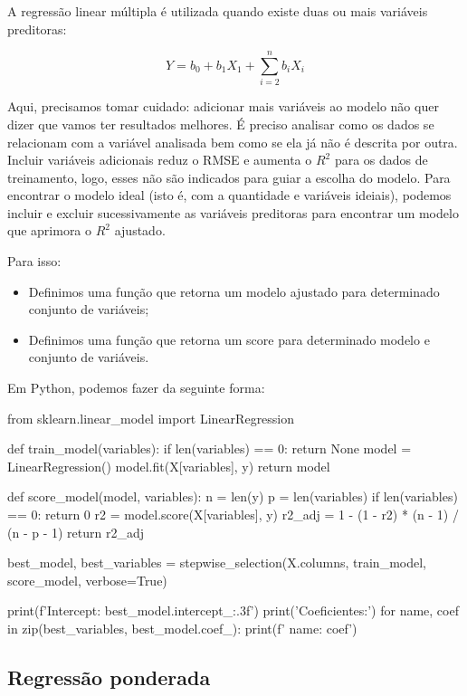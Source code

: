 \documentclass{article}
\begin{document}
A regressão linear múltipla é utilizada quando existe duas ou mais variáveis preditoras:

\begin{equation}
    Y = b_0 + b_1X_1 + \sum_{i = 2}^{n}b_iX_i
\end{equation}

Aqui, precisamos tomar cuidado: adicionar mais variáveis ao modelo não quer dizer que vamos ter resultados melhores.
É preciso analisar como os dados se relacionam com a variável analisada bem como se ela já não é descrita por outra.
Incluir variáveis adicionais reduz o RMSE e aumenta o $R^2$ para os dados de treinamento, logo, esses não são 
indicados para guiar a escolha do modelo. Para encontrar o modelo ideal (isto é, com a quantidade e variáveis ideiais),
podemos incluir e excluir sucessivamente as variáveis preditoras para encontrar um modelo que aprimora o $R^2$ ajustado.

Para isso:

\begin{itemize}
    \item Definimos uma função que retorna um modelo ajustado para determinado conjunto de variáveis;
    \item Definimos uma função que retorna um score para determinado modelo e conjunto de variáveis.
\end{itemize}

Em Python, podemos fazer da seguinte forma:

\begin{pythoncode}
from sklearn.linear_model import LinearRegression

def train_model(variables):
    if len(variables) == 0:
        return None 
    model = LinearRegression()
    model.fit(X[variables], y)
    return model 

def score_model(model, variables):
    n = len(y)
    p = len(variables)
    if len(variables) == 0:
        return 0 
    r2 = model.score(X[variables], y) 
    r2_adj = 1 - (1 - r2) * (n - 1) / (n - p - 1)
    return r2_adj

best_model, best_variables = stepwise_selection(X.columns, train_model, score_model, verbose=True)

print(f'Intercept: {best_model.intercept_:.3f}')
print('Coeficientes:')
for name, coef in zip(best_variables, best_model.coef_):
    print(f' {name}: {coef}')
\end{pythoncode}

\subsection{Regressão ponderada}
\end{document}
